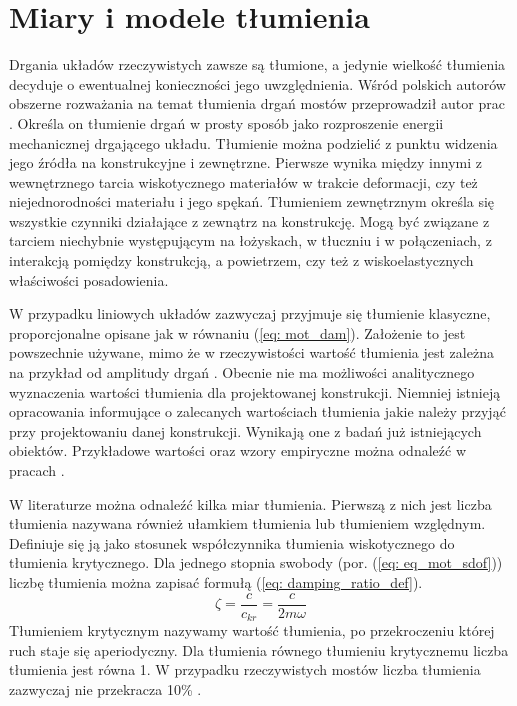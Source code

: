 \section{Miary i modele tłumienia}
Drgania układów rzeczywistych zawsze są tłumione, a jedynie wielkość tłumienia decyduje o ewentualnej konieczności jego uwzględnienia. Wśród polskich autorów obszerne rozważania na temat tłumienia drgań mostów przeprowadził autor prac \cite{Salamak2003,Salamak2007}. Określa on tłumienie drgań w prosty sposób jako rozproszenie energii mechanicznej drgającego układu. Tłumienie można podzielić z punktu widzenia jego źródła na konstrukcyjne i zewnętrzne. Pierwsze wynika między innymi z wewnętrznego tarcia wiskotycznego materiałów w trakcie deformacji, czy też niejednorodności materiału i jego spękań. Tłumieniem zewnętrznym określa się wszystkie czynniki działające z zewnątrz na konstrukcję. Mogą być związane z tarciem niechybnie występującym na łożyskach, w tłuczniu i w połączeniach, z interakcją pomiędzy konstrukcją, a powietrzem, czy też z wiskoelastycznych właściwości posadowienia.

W przypadku liniowych układów zazwyczaj przyjmuje się tłumienie klasyczne, proporcjonalne opisane jak w równaniu (\ref{eq: mot_dam}). Założenie to jest powszechnie używane, mimo że w rzeczywistości wartość tłumienia jest zależna na przykład od amplitudy drgań \parencite{Ladislav1996}. Obecnie nie ma możliwości analitycznego wyznaczenia wartości tłumienia dla projektowanej konstrukcji. Niemniej istnieją opracowania informujące o zalecanych wartościach tłumienia jakie należy przyjąć przy projektowaniu danej konstrukcji. Wynikają one z badań już istniejących obiektów. Przykładowe wartości oraz wzory empiryczne można odnaleźć w pracach \parencite{Fryba1999,Salamak2003, Bachmann2012,Yamaguchi1997}. 

W literaturze można odnaleźć kilka miar tłumienia. Pierwszą z nich jest liczba tłumienia  nazywana również ułamkiem tłumienia lub tłumieniem względnym. Definiuje się ją jako stosunek współczynnika tłumienia wiskotycznego do tłumienia krytycznego. Dla jednego stopnia swobody (por. (\ref{eq: eq_mot_sdof})) liczbę tłumienia można zapisać formułą (\ref{eq: damping_ratio_def}).
\begin{equation} \label{eq: damping_ratio_def}
	\zeta = \frac{c}{c_{kr}}=\frac{c}{2m\omega}
\end{equation}
Tłumieniem krytycznym nazywamy wartość tłumienia, po przekroczeniu której ruch staje się aperiodyczny. Dla tłumienia równego tłumieniu krytycznemu liczba tłumienia jest równa 1. W przypadku rzeczywistych mostów liczba tłumienia zazwyczaj nie przekracza 10\% \parencite{Salamak2003}. 

